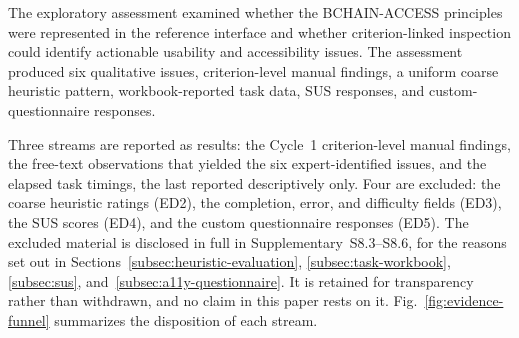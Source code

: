 \documentclass[journal]{IEEEtran}
\begin{document}
The exploratory assessment examined whether the BCHAIN-ACCESS principles were represented in the reference interface and whether criterion-linked inspection could identify actionable usability and accessibility issues. The assessment produced six qualitative issues, criterion-level manual findings, a uniform coarse heuristic pattern, workbook-reported task data, SUS responses, and custom-questionnaire responses.

Three streams are reported as results: the Cycle~1 criterion-level manual findings, the free-text observations that yielded the six expert-identified issues, and the elapsed task timings, the last reported descriptively only. Four are excluded: the coarse heuristic ratings (ED2), the completion, error, and difficulty fields (ED3), the SUS scores (ED4), and the custom questionnaire responses (ED5). The excluded material is disclosed in full in Supplementary~S8.3--S8.6, for the reasons set out in Sections~\ref{subsec:heuristic-evaluation}, \ref{subsec:task-workbook}, \ref{subsec:sus}, and~\ref{subsec:a11y-questionnaire}. It is retained for transparency rather than withdrawn, and no claim in this paper rests on it. Fig.~\ref{fig:evidence-funnel} summarizes the disposition of each stream.
\end{document}
